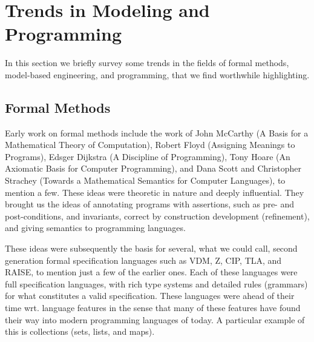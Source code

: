 
\section{Trends in Modeling and Programming}
\label{sec:trends}

In this section we briefly survey some trends in the fields of
formal methods, model-based engineering, and programming, that we find worthwhile highlighting.


\subsection{Formal Methods}

Early work on formal methods include the work of John McCarthy 
(A Basis for a Mathematical Theory of Computation), Robert Floyd (Assigning Meanings to Programs), Edsger 
Dijkstra (A Discipline of Programming), Tony Hoare (An Axiomatic 
Basis for Computer Programming), and Dana Scott and Christopher 
Strachey (Towards a Mathematical Semantics for Computer Languages), 
to mention a few. These ideas were theoretic in nature and deeply 
influential. They brought us the ideas of  annotating programs with 
assertions, such as pre- and post-conditions, and invariants, 
correct by construction development (refinement), and giving 
semantics to programming languages. 

These ideas were subsequently the basis for several, what we could 
call, second generation formal specification languages such as 
VDM, Z, CIP, TLA, and RAISE, to mention just a few of the earlier ones. Each of these languages were full 
specification languages, with rich type systems and detailed rules 
(grammars) for what constitutes a valid specification. These 
languages were ahead of their time wrt. language features in the 
sense that many of these features have found their 
way into modern programming languages of today. A particular
example of this is collections (sets, lists, and maps).

